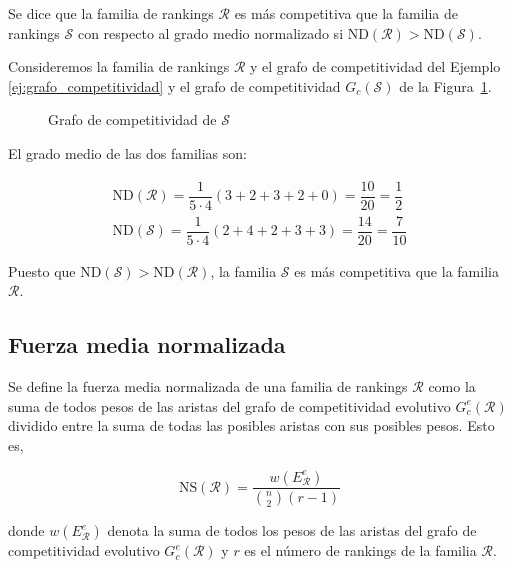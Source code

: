 \begin{defi}
Se dice que la familia de rankings $\mathcal{R}$ es más competitiva que la familia de rankings $\mathcal{S}$ con respecto al grado medio normalizado si $\mathrm{ND}(\mathcal{R}) > \mathrm{ND}(\mathcal{S})$.
\end{defi}

\begin{ejemplo}
Consideremos la familia de rankings $\mathcal{R}$ y el grafo de competitividad del Ejemplo~ \ref{ej:grafo_competitividad} y el grafo de competitividad $G_c(\mathcal{S})$ de la Figura~\ref{fig:grado_medio}.\\


\begin{figure}[htb]
\centering
\ejemplogradomedio
\caption{Grafo de competitividad de $\mathcal{S}$}
\label{fig:grado_medio}
\end{figure}

El grado medio de las dos familias son:

\begin{eqnarray*}
\mathrm{ND}(\mathcal{R}) = \dfrac{1}{5\cdot 4} (3 + 2 + 3 + 2 + 0) = \dfrac{10}{20} = \dfrac{1}{2}\\
\mathrm{ND}(\mathcal{S}) = \dfrac{1}{5\cdot 4} (2 + 4 + 2 + 3 + 3) = \dfrac{14}{20} = \dfrac{7}{10}
\end{eqnarray*}

Puesto que $\mathrm{ND}(\mathcal{S}) > \mathrm{ND}(\mathcal{R})$, la familia $\mathcal{S}$ es más competitiva que la familia $\mathcal{R}$.
\end{ejemplo}

\subsection*{Fuerza media normalizada}

\begin{defi}
Se define la fuerza media normalizada de una familia de rankings $\mathcal{R}$ como la suma de todos pesos de las aristas del grafo de competitividad evolutivo $G_c^e(\mathcal{R})$ dividido entre la suma de todas las posibles aristas con sus posibles pesos. Esto es,

\begin{equation}
\mathrm{NS}(\mathcal{R}) = \dfrac{w(E_\mathcal{R}^e)}{\binom{n}{2} (r-1)}
\end{equation} 

donde $w(E_\mathcal{R}^e)$ denota la suma de todos los pesos de las aristas del grafo de competitividad evolutivo $G_c^e(\mathcal{R})$ y $r$ es el número de rankings de la familia $\mathcal{R}$.
\end{defi}

